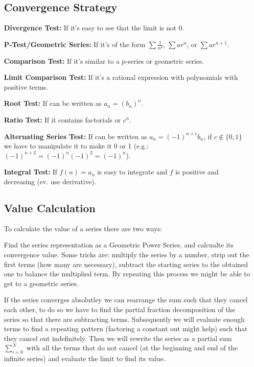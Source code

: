 \documentclass[8pt,a4paper]{extarticle}     %
\theoremstyle{definition}
\theoremstyle{definition}
\theoremstyle{definition}
\begin{document}
\begin{multicols}{4}
\subsection{Convergence Strategy}
\begin{numberlist}
	\item \textbf{Divergence Test:} If it's easy to see that the limit is not 0.
	\item \textbf{P-Test/Geometric Series:} If it's of the form $\sum \frac{1}{n^p}$, $\sum ar^n$, or $\sum ar^{n+1}$.
	\item \textbf{Comparison Test:} If it's similar to a p-series or geometric series.
	\item \textbf{Limit Comparison Test:} If it's a rational expression with polynomials with positive terms.
	\item \textbf{Root Test:} If can be written as $a_n = (b_n)^n$.
	\item \textbf{Ratio Test:} If it contains factorials or $c^n$.
	\item \textbf{Alternating Series Test:} If can be written as $a_n=(-1)^{n+c}b_n$, if $c\notin\{0,1\}$ we have to manipulate it to make it 0 or 1 (e.g.: $(-1)^{n+2} = (-1)^n(-1)^2=(-1)^n$).
	\item \textbf{Integral Test:} If $f(n) = a_n$ is easy to integrate and $f$ is positive and decreasing (ev. use derivative).
\end{numberlist}
\subsection{Value Calculation}
To calculate the value of a series there are two ways:
\begin{numberlist}
	\item Find the series representation as a Geometric Power Series, and calcualte its convergence value. Some tricks are: multiply the series by a number, strip out the first terms (how many are necessary), subtract the starting series to the obtained one to balance the multiplied term. By repeating this process we might be able to get to a geometric series.
	\item If the series converges absolutley we can rearrange the sum such that they cancel each other, to do so we have to find the partial fraction decomposition of the series so that there are subtracting terms. Subsequently we will evaluate enough terms to find a repeating pattern (factoring a constant out might help) such that they cancel out indefinitely. Then we will rewrite the series as a partial sum $\sum_{i=0}^N$ with all the terms that do not cancel (at the beginning and end of the infinite series) and evaluate the limit to find its value.
\end{numberlist}


\end{multicols}
\end{document}
